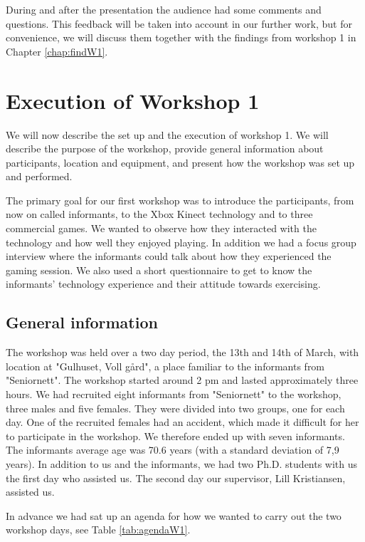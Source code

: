During and after the presentation the audience had some comments and questions. This feedback will be taken into account in our further work, but for convenience, we will discuss them together with the findings from workshop 1 in Chapter \ref{chap:findW1}. 

\section{Execution of Workshop 1}
\label{sec:ws1}
We will now describe the set up and the execution of workshop 1. We will describe the purpose of the workshop, provide general information about participants, location and equipment, and present how the workshop was set up and performed. 

The primary goal for our first workshop was to introduce the participants, from now on called informants, to the Xbox Kinect technology and to three commercial games. We wanted to observe how they interacted with the technology and how well they enjoyed playing. In addition we had a focus group interview where the informants could talk about how they experienced the gaming session. We also used a short questionnaire to get to know the informants' technology experience and their attitude towards exercising.   

\subsection{General information}
The workshop was held over a two day period, the 13th and 14th of March, with location at "Gulhuset, Voll gård", a place familiar to the informants from "Seniornett". The workshop started around 2 pm and lasted approximately three hours. We had recruited eight informants from "Seniornett" to the workshop, three males and five females. They were divided into two groups, one for each day. One of the recruited females had an accident, which made it difficult for her to participate in the workshop. We therefore ended up with seven informants. The informants average age was 70.6 years (with a standard deviation of 7,9 years). In addition to us and the informants, we had two Ph.D. students with us the first day who assisted us. The second day our supervisor, Lill Kristiansen, assisted us. 

In advance we had sat up an agenda for how we wanted to carry out the two workshop days,  see Table \ref{tab:agendaW1}.  

